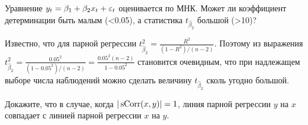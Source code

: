 \documentclass[pdftex,11pt,openany]{book}
\begin{document}
\begin{problem}
Уравнение $y_t = \beta_1 + \beta_2 x_t + \varepsilon_t$ оценивается по МНК. Может ли коэффициент детерминации быть малым (<0.05), а статистика $t_{\hat{\beta}_2}$ большой (>10)?
\end{problem}

\begin{solution}
Известно, что для парной регрессии $t_{\hat{\beta}_2}^2 = \frac{R^2}{(1 - R^2)/(n-2)}$. Поэтому из выражения $t_{\hat{\beta}_2}^2 = \frac{0.05^2}{(1 - 0.05^2)/(n-2)} = \frac{0.05^2 (n-2)}{1 - 0.05^2}$ становится очевидным, что при надлежащем выборе числа наблюдений можно сделать величину $t_{\hat{\beta}_2}$ сколь угодно большой.
\end{solution}


\begin{problem}
 Докажите, что в случае, когда $|\operatorname{sCorr}(x, y)| = 1$, линия парной регрессии $y$ на $x$ совпадает с линией парной регрессии $x$ на $y$.
\end{problem}
\end{document}
